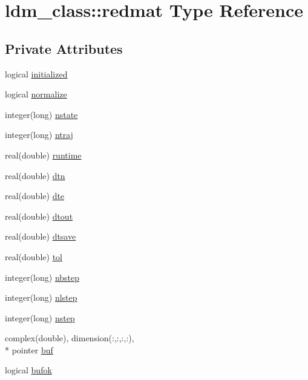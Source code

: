 \hypertarget{structldm__class_1_1redmat}{\section{ldm\+\_\+class\+:\+:redmat Type Reference}
\label{structldm__class_1_1redmat}
}
\subsection*{Private Attributes}
\begin{DoxyCompactItemize}
\item 
logical \hyperlink{structldm__class_1_1redmat_a40106b7f6323bf6c0a81282d1c7598cf}{initialized}
\item 
logical \hyperlink{structldm__class_1_1redmat_a3fcd0f23c62bf277ec3b685ba133a12e}{normalize}
\item 
integer(long) \hyperlink{structldm__class_1_1redmat_a4a3d076bf44d40c727872572e0cb4ffa}{nstate}
\item 
integer(long) \hyperlink{structldm__class_1_1redmat_a63ac84d3e9fcc447110bcbee283dcda6}{ntraj}
\item 
real(double) \hyperlink{structldm__class_1_1redmat_af8724134beda331016cb0436c7bb3361}{runtime}
\item 
real(double) \hyperlink{structldm__class_1_1redmat_ac63e64eb9cffeaca990fd76f1dc9c735}{dtn}
\item 
real(double) \hyperlink{structldm__class_1_1redmat_a28ce83b8f08247d607e2f88a5f811f01}{dte}
\item 
real(double) \hyperlink{structldm__class_1_1redmat_a869fcbf86af7606fd8aa789f4223bbf4}{dtout}
\item 
real(double) \hyperlink{structldm__class_1_1redmat_a733cc05e99f71f9d84e170413b3c326d}{dtsave}
\item 
real(double) \hyperlink{structldm__class_1_1redmat_a84dbf8ac876c4a77ee0f4d7a7dd0ed3e}{tol}
\item 
integer(long) \hyperlink{structldm__class_1_1redmat_a17ada8a43b4b1da095624fef4b24484a}{nbstep}
\item 
integer(long) \hyperlink{structldm__class_1_1redmat_afaf29217f4fb1049c6fd7b77f6e8ad81}{nlstep}
\item 
integer(long) \hyperlink{structldm__class_1_1redmat_a1725aca6218f0db2c4bf6370a0e95dba}{nstep}
\item 
complex(double), dimension(\+:,\+:,\+:,\+:), \\*
pointer \hyperlink{structldm__class_1_1redmat_a0de897accb7698c28bc90f5c676b016a}{buf}
\item 
logical \hyperlink{structldm__class_1_1redmat_ac8f3b2f71725d3d4cc6ae9a19d415513}{bufok}
\end{DoxyCompactItemize}


